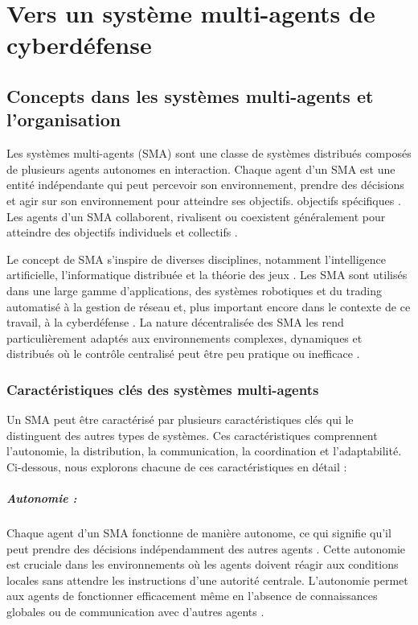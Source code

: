 \chapter{Vers un système multi-agents de cyberdéfense}\label{ch:towards_cSMA}

\section{Concepts dans les systèmes multi-agents et l'organisation}

Les systèmes multi-agents (SMA) sont une classe de systèmes distribués composés de plusieurs agents autonomes en interaction. Chaque agent d'un SMA est une entité indépendante qui peut percevoir son environnement, prendre des décisions et agir sur son environnement pour atteindre ses objectifs. objectifs spécifiques \cite{ferber1999multi}. Les agents d'un SMA collaborent, rivalisent ou coexistent généralement pour atteindre des objectifs individuels et collectifs \cite{weiss1999multiagent}.

Le concept de SMA s'inspire de diverses disciplines, notamment l'intelligence artificielle, l'informatique distribuée et la théorie des jeux \cite{shoham2008multiagent}. Les SMA sont utilisés dans une large gamme d'applications, des systèmes robotiques et du trading automatisé à la gestion de réseau et, plus important encore dans le contexte de ce travail, à la cyberdéfense \cite{jennings1998applications, shakarian2015cyber}. La nature décentralisée des SMA les rend particulièrement adaptés aux environnements complexes, dynamiques et distribués où le contrôle centralisé peut être peu pratique ou inefficace \cite{sycara1998multiagent}.

\subsection{Caractéristiques clés des systèmes multi-agents}

Un SMA peut être caractérisé par plusieurs caractéristiques clés qui le distinguent des autres types de systèmes. Ces caractéristiques comprennent l'autonomie, la distribution, la communication, la coordination et l'adaptabilité. Ci-dessous, nous explorons chacune de ces caractéristiques en détail :

\paragraph{Autonomie :}
Chaque agent d'un SMA fonctionne de manière autonome, ce qui signifie qu'il peut prendre des décisions indépendamment des autres agents \cite{jennings1998applications}. Cette autonomie est cruciale dans les environnements où les agents doivent réagir aux conditions locales sans attendre les instructions d'une autorité centrale. L'autonomie permet aux agents de fonctionner efficacement même en l'absence de connaissances globales ou de communication avec d'autres agents \cite{russell2016artificial}.

